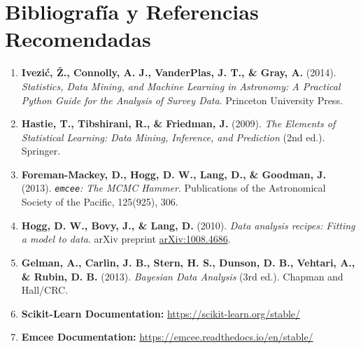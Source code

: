 \documentclass[11pt,a4paper]{article}
\begin{document}
\section{Bibliografía y Referencias Recomendadas}
\label{sec:bibliografia}

\begin{enumerate}[leftmargin=*,itemsep=2pt]
    \item \textbf{Ivezi\'{c}, \v{Z}., Connolly, A. J., VanderPlas, J. T., \& Gray, A.} (2014). \textit{Statistics, Data Mining, and Machine Learning in Astronomy: A Practical Python Guide for the Analysis of Survey Data}. Princeton University Press.
    \item \textbf{Hastie, T., Tibshirani, R., \& Friedman, J.} (2009). \textit{The Elements of Statistical Learning: Data Mining, Inference, and Prediction} (2nd ed.). Springer.
    \item \textbf{Foreman-Mackey, D., Hogg, D. W., Lang, D., \& Goodman, J.} (2013). \textit{\texttt{emcee}: The MCMC Hammer}. Publications of the Astronomical Society of the Pacific, 125(925), 306.
    \item \textbf{Hogg, D. W., Bovy, J., \& Lang, D.} (2010). \textit{Data analysis recipes: Fitting a model to data}. arXiv preprint \href{https://arxiv.org/abs/1008.4686}{arXiv:1008.4686}.
    \item \textbf{Gelman, A., Carlin, J. B., Stern, H. S., Dunson, D. B., Vehtari, A., \& Rubin, D. B.} (2013). \textit{Bayesian Data Analysis} (3rd ed.). Chapman and Hall/CRC.
    \item \textbf{Scikit-Learn Documentation:} \url{https://scikit-learn.org/stable/}
    \item \textbf{Emcee Documentation:} \url{https://emcee.readthedocs.io/en/stable/}
\end{enumerate}
\end{document}
